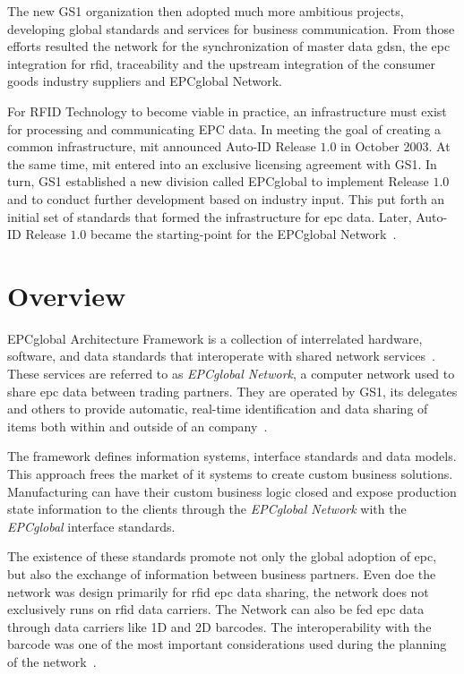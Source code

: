 The new GS1 organization then adopted much more ambitious projects, developing global standards and services for business communication.
From those efforts resulted the network for the synchronization of master data \ac{gdsn}, the \ac{epc} integration for \ac{rfid}, traceability and the upstream integration of the consumer goods industry suppliers and EPCglobal Network.

For RFID Technology to become viable in practice, an infrastructure must exist for processing and communicating EPC data. In meeting the goal of creating a common infrastructure, \ac{mit} announced Auto-ID Release $1.0$ in October 2003. At the same time, \ac{mit} entered into an exclusive licensing agreement with GS1.
In turn, GS1 established a new division called EPCglobal to implement Release $1.0$ and to conduct further development based on industry input. This put forth an initial set of standards that formed the infrastructure for \ac{epc} data. Later, Auto-ID Release $1.0$ became the starting-point for the EPCglobal Network~\cite{GlobalRFIDValue}.

\section{Overview}


EPCglobal Architecture Framework is a collection of interrelated hardware, software, and data standards that interoperate with shared network services~\cite{Architecture6framework20140414Pdf}.
These services are referred to as \emph{EPCglobal Network}, a computer network used to share \ac{epc} data between trading partners.
They are operated by GS1, its delegates and others to provide automatic, real-time identification and data sharing of items both within and outside of an company~\cite[p. 213]{lahiriRFIDSourcebook2005}.

The framework defines information systems, interface standards and data models. This approach frees the market of \ac{it} systems to create custom business solutions. Manufacturing can have their custom business logic closed and expose production state information to the clients through the \emph{EPCglobal Network} with the \emph{EPCglobal} interface standards.

The existence of these standards promote not only the global adoption of \ac{epc}, but also the exchange of information between business partners.
Even doe the network was design primarily for \ac{rfid} \ac{epc} data sharing, the network does not exclusively runs on \ac{rfid} data carriers. The Network can also be fed \ac{epc} data through data carriers like 1D and 2D barcodes. The interoperability with the barcode was one of the most important considerations used during the planning of the network~\cite{RFIDBarcodeInteroperability}.

